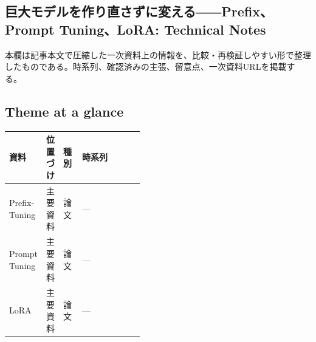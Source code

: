 \subsection*{巨大モデルを作り直さずに変える――Prefix、Prompt Tuning、LoRA: Technical Notes}
本欄は記事本文で圧縮した一次資料上の情報を、比較・再検証しやすい形で整理したものである。時系列、確認済みの主張、留意点、一次資料URLを掲載する。
\smallskip
{}\par
\medskip
\subsection*{Theme at a glance}
\begin{center}
\footnotesize
\begin{tabularx}{\linewidth}{@{}p{0.20\linewidth}p{0.10\linewidth}p{0.14\linewidth}X@{}}
\toprule
資料 & 位置づけ & 種別 & 時系列 \\
\midrule
Prefix-Tuning & 主要資料 & 論文 & — \\
Prompt Tuning & 主要資料 & 論文 & — \\
LoRA & 主要資料 & 論文 & — \\
\bottomrule
\end{tabularx}
\end{center}
\normalsize

